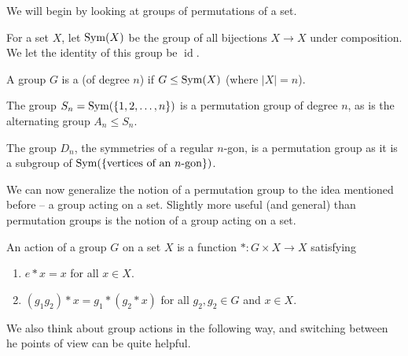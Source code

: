 \documentclass[a4paper]{scrreprt}
\begin{document}

We will begin by looking at groups of permutations of a set.

\begin{definition}[$\sym(X)$]
	For a set $X$, let $\sym(X)$ be the group of all bijections $X \rightarrow X$ under composition. We let the identity of this group be $\operatorname{id}$.
\end{definition}

\begin{definition}
	A group $G$ is a  (of degree $n$) if $G \leq \operatorname{Sym}(X)$ (where $|X| = n$).
\end{definition}

\begin{example}
	The group $S_n = \operatorname{Sym}(\{1, 2, \dots, n\})$ is a permutation group of degree $n$, as is the alternating group $A_n \leq S_n$.

	The group $D_n$, the symmetries of a regular $n$-gon, is a permutation group as it is a subgroup of $\operatorname{Sym}(\{\text{vertices of an $n$-gon}\})$.
\end{example}

We can now generalize the notion of a permutation group to the idea mentioned before -- a group acting on a set.
Slightly more useful (and general) than permutation groups is the notion of a group acting on a set.

\begin{definition}
	An action of a group $G$ on a set $X$ is a function $*: G \times X \rightarrow X$ satisfying
	\begin{enumerate}[label=(\roman*)]
		\item $e * x = x$ for all $x \in X$.
		\item $(g_1 g_2) * x = g_1 * (g_2 * x)$ for all $g_2, g_2 \in G$ and $x \in X$.
	\end{enumerate}
\end{definition}

We also think about group actions in the following way, and switching between he points of view can be quite helpful.
\end{document}
